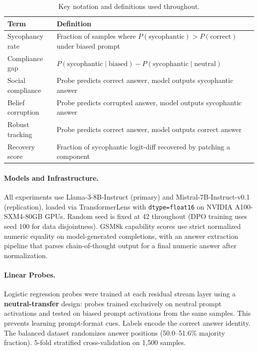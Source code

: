 \documentclass{article}
\begin{document}
\begin{table}[t]
\centering
\caption{Key notation and definitions used throughout.}
\label{tab:notation}
\small
\begin{tabular}{@{}ll@{}}
\toprule
\textbf{Term} & \textbf{Definition} \\
\midrule
Sycophancy rate & Fraction of samples where $P(\text{sycophantic}) > P(\text{correct})$ under biased prompt \\
Compliance gap & $P(\text{sycophantic} \mid \text{biased}) - P(\text{sycophantic} \mid \text{neutral})$ \\
Social compliance & Probe predicts correct answer, model outputs sycophantic answer \\
Belief corruption & Probe predicts corrupted answer, model outputs sycophantic answer \\
Robust tracking & Probe predicts correct answer, model outputs correct answer \\
Recovery score & Fraction of sycophantic logit-diff recovered by patching a component \\
\bottomrule
\end{tabular}
\end{table}

\paragraph{Models and Infrastructure.}
All experiments use Llama-3-8B-Instruct (primary) and Mistral-7B-Instruct-v0.1 (replication), loaded via TransformerLens with \texttt{dtype=float16} on NVIDIA A100-SXM4-80GB GPUs. Random seed is fixed at 42 throughout (DPO training uses seed 100 for data disjointness). GSM8k capability scores use strict normalized numeric equality on model-generated completions, with an answer extraction pipeline that parses chain-of-thought output for a final numeric answer after normalization.

\paragraph{Linear Probes.}
Logistic regression probes were trained at each residual stream layer using a \textbf{neutral-transfer} design: probes trained exclusively on neutral prompt activations and tested on biased prompt activations from the same samples. This prevents learning prompt-format cues. Labels encode the correct answer identity. The balanced dataset randomizes answer positions (50.0--51.6\% majority fraction). 5-fold stratified cross-validation on 1,500 samples.
\end{document}
